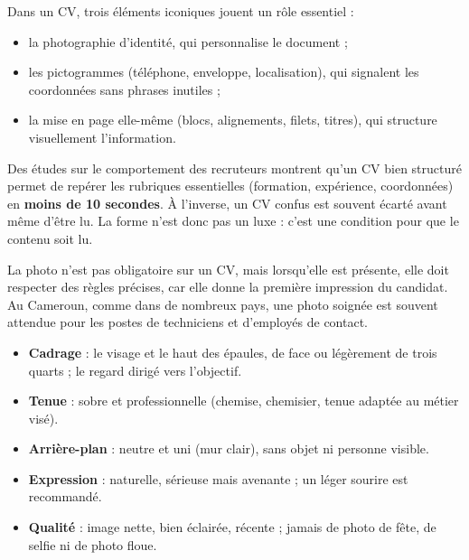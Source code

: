 \documentclass[11pt]{article}
\newcommand{\cle}[1]{{\popxbold\color{popdark}#1}}
\newcounter{popsec}
\newcounter{popsub}
\newcommand{\courssub}[1]{%
  \stepcounter{popsub}%
  \par\vspace{9pt}\noindent{\popxbold\fontsize{11.5}{13}\selectfont\color{popink}{\color{poporange}\thepopsec.\thepopsub}\hspace{6pt}#1}\par\nopagebreak\vspace{4pt}
}
\begin{document}
Dans un CV, trois éléments iconiques jouent un rôle essentiel :
\begin{itemize}
\item la \cle{photographie d'identité}, qui personnalise le document ;
\item les \cle{pictogrammes} (téléphone, enveloppe, localisation), qui signalent les coordonnées sans phrases inutiles ;
\item la \cle{mise en page} elle-même (blocs, alignements, filets, titres), qui structure visuellement l'information.
\end{itemize}

\begin{exemplebox}
Des études sur le comportement des recruteurs montrent qu'un CV bien structuré permet de repérer les rubriques essentielles (formation, expérience, coordonnées) en \textbf{moins de 10 secondes}. À l'inverse, un CV confus est souvent écarté avant même d'être lu. La forme n'est donc pas un luxe : c'est une condition pour que le contenu soit lu.
\end{exemplebox}

\courssub{La photographie d'identité}

La photo n'est pas obligatoire sur un CV, mais lorsqu'elle est présente, elle doit respecter des règles précises, car elle donne la première impression du candidat. Au Cameroun, comme dans de nombreux pays, une photo soignée est souvent attendue pour les postes de techniciens et d'employés de contact.

\begin{propriete}
\begin{itemize}
\item \textbf{Cadrage} : le visage et le haut des épaules, de face ou légèrement de trois quarts ; le regard dirigé vers l'objectif.
\item \textbf{Tenue} : sobre et professionnelle (chemise, chemisier, tenue adaptée au métier visé).
\item \textbf{Arrière-plan} : neutre et uni (mur clair), sans objet ni personne visible.
\item \textbf{Expression} : naturelle, sérieuse mais avenante ; un léger sourire est recommandé.
\item \textbf{Qualité} : image nette, bien éclairée, récente ; jamais de photo de fête, de selfie ni de photo floue.
\end{itemize}
\end{propriete}
\end{document}
